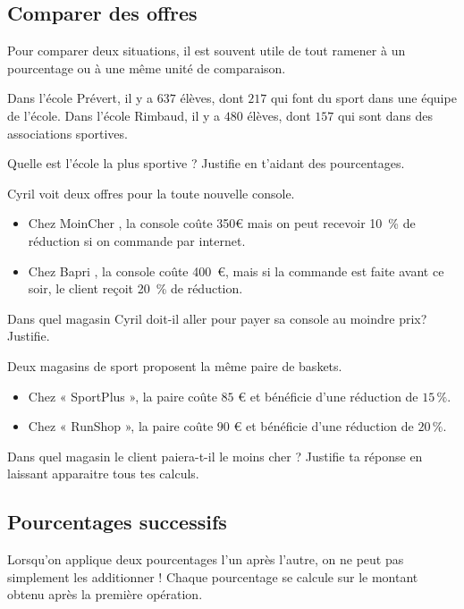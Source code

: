 \documentclass[../../syllabus_1.tex]{subfiles}
\begin{document}
\newpage
\subsection{Comparer des offres}

Pour comparer deux situations, il est souvent utile de tout ramener à un pourcentage ou à une même unité de comparaison.

\begin{exercise}
    Dans l'école Prévert, il y a $637$ élèves, dont $217$ qui font du sport dans une équipe de l'école. Dans l'école Rimbaud, il y a $480$ élèves, dont $157$ qui sont dans des associations sportives.

    Quelle est l'école la plus sportive ? Justifie en t'aidant des pourcentages.
    \vspace{3cm}
\end{exercise}

\begin{exercise}
    Cyril voit deux offres pour la toute nouvelle console.
    \begin{itemize}[label=\faGamepad]
        \item Chez \og MoinCher \fg, la console coûte 350€ mais on peut recevoir 10~\% de réduction si on commande par internet.
        \item Chez \og Bapri \fg, la console coûte 400~€, mais si la commande est faite avant ce soir, le client reçoit 20~\% de réduction.
    \end{itemize}
    Dans quel magasin Cyril doit-il aller pour payer sa console au moindre prix? Justifie.
    \vspace{3cm}
\end{exercise}

\begin{exercise}
    Deux magasins de sport proposent la même paire de baskets.
    \begin{itemize}
        \item Chez « SportPlus », la paire coûte $85$ € et bénéficie d'une réduction de $15\,\%$.
        \item Chez « RunShop », la paire coûte $90$ € et bénéficie d'une réduction de $20\,\%$.
    \end{itemize}
    Dans quel magasin le client paiera-t-il le moins cher ? Justifie ta réponse en laissant apparaitre tous tes calculs.
    \vspace{3cm}
\end{exercise}

\newpage
\subsection{Pourcentages successifs}
Lorsqu'on applique deux pourcentages l'un après l'autre, on ne peut pas simplement les additionner ! Chaque pourcentage se calcule sur le montant obtenu après la première opération.
\end{document}

